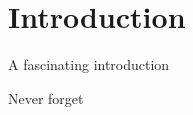 
\section{Introduction}
\label{sec:introduction}

A fascinating introduction

Never forget \cite{Shannon-1948}
